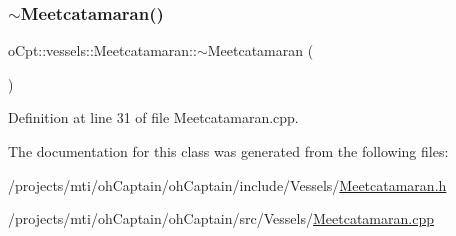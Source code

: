 \subsubsection{\texorpdfstring{$\sim$\+Meetcatamaran()}{~Meetcatamaran()}}
{\footnotesize\ttfamily o\+Cpt\+::vessels\+::\+Meetcatamaran\+::$\sim$\+Meetcatamaran (\begin{DoxyParamCaption}{ }\end{DoxyParamCaption})\hspace{0.3cm}{\ttfamily [virtual]}}



Definition at line 31 of file Meetcatamaran.\+cpp.



The documentation for this class was generated from the following files\+:\begin{DoxyCompactItemize}
\item 
/projects/mti/oh\+Captain/oh\+Captain/include/\+Vessels/\hyperlink{_meetcatamaran_8h}{Meetcatamaran.\+h}\item 
/projects/mti/oh\+Captain/oh\+Captain/src/\+Vessels/\hyperlink{_meetcatamaran_8cpp}{Meetcatamaran.\+cpp}\end{DoxyCompactItemize}
